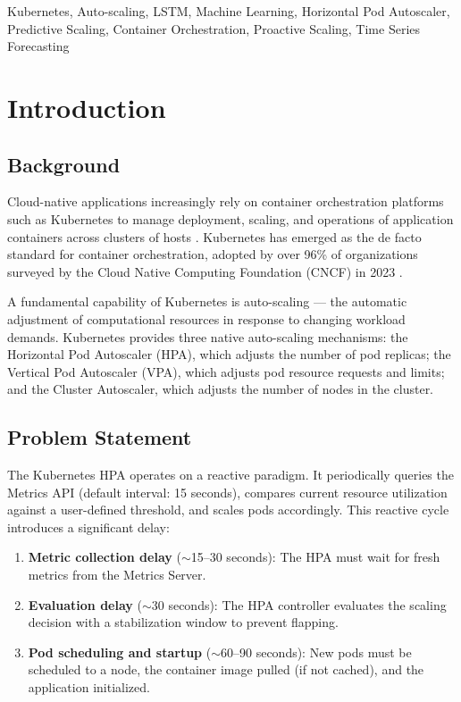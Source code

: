 \documentclass[journal]{IEEEtran}
\begin{document}
\begin{IEEEkeywords}
Kubernetes, Auto-scaling, LSTM, Machine Learning, Horizontal Pod Autoscaler, Predictive Scaling, Container Orchestration, Proactive Scaling, Time Series Forecasting
\end{IEEEkeywords}

\section{Introduction}

\subsection{Background}
Cloud-native applications increasingly rely on container orchestration platforms such as Kubernetes to manage deployment, scaling, and operations of application containers across clusters of hosts \cite{burns2016}. Kubernetes has emerged as the de facto standard for container orchestration, adopted by over 96\% of organizations surveyed by the Cloud Native Computing Foundation (CNCF) in 2023 \cite{cncf2023}.

A fundamental capability of Kubernetes is auto-scaling --- the automatic adjustment of computational resources in response to changing workload demands. Kubernetes provides three native auto-scaling mechanisms: the Horizontal Pod Autoscaler (HPA), which adjusts the number of pod replicas; the Vertical Pod Autoscaler (VPA), which adjusts pod resource requests and limits; and the Cluster Autoscaler, which adjusts the number of nodes in the cluster.

\subsection{Problem Statement}
The Kubernetes HPA operates on a reactive paradigm. It periodically queries the Metrics API (default interval: 15 seconds), compares current resource utilization against a user-defined threshold, and scales pods accordingly. This reactive cycle introduces a significant delay:

\begin{enumerate}
    \item \textbf{Metric collection delay} ($\sim$15--30 seconds): The HPA must wait for fresh metrics from the Metrics Server.
    \item \textbf{Evaluation delay} ($\sim$30 seconds): The HPA controller evaluates the scaling decision with a stabilization window to prevent flapping.
    \item \textbf{Pod scheduling and startup} ($\sim$60--90 seconds): New pods must be scheduled to a node, the container image pulled (if not cached), and the application initialized.
\end{enumerate}
\end{document}
